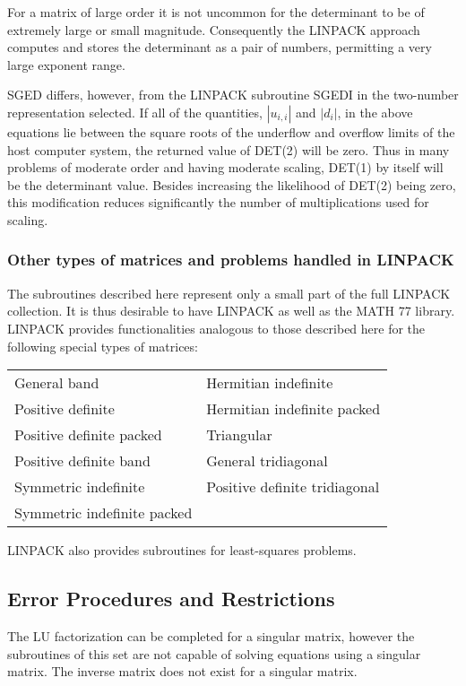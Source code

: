 \documentclass[twoside]{MATH77}
\begin{document}
For a matrix of large order it is not uncommon for the determinant to be of
extremely large or small magnitude. Consequently the LINPACK approach
computes and stores the determinant as a pair of numbers, permitting a very
large exponent range.

SGED differs, however, from the LINPACK subroutine SGEDI in the two-number
representation selected. If all of the quantities, $|u_{i,i}|$ and $|d_i|$,
in the above equations lie between the square roots of the underflow and
overflow limits of the host computer system, the returned value of DET(2)
will be zero. Thus in many problems of moderate order and having moderate
scaling, DET(1) by itself will be the determinant value. Besides increasing
the likelihood of DET(2) being zero, this modification reduces significantly
the number of multiplications used for scaling.

\subsubsection{Other types of matrices and problems handled in
LINPACK}

The subroutines described here represent only a small part of the full
LINPACK collection. It is thus desirable to have LINPACK as well as the MATH
77 library. LINPACK provides functionalities analogous to those described
here for the following special types of matrices:

\begin{tabular}{@{}l@{}l}
General band & Hermitian indefinite\\
Positive definite & Hermitian indefinite packed\\
Positive definite packed & Triangular\\
Positive definite band & General tridiagonal\\
Symmetric indefinite & Positive definite tridiagonal\\
Symmetric indefinite packed & \
\end{tabular}

LINPACK also provides subroutines for least-squares problems.




\subsection{Error Procedures and Restrictions}

The LU factorization can be completed for a singular matrix, however the
subroutines of this set are not capable of solving equations using a
singular matrix. The inverse matrix does not exist for a singular matrix.
\end{document}
